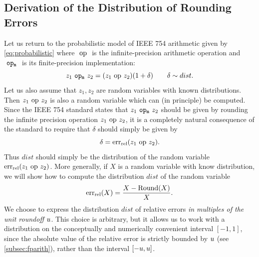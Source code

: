 \subsection{Derivation of the Distribution of Rounding Errors}\label{subsec:LPerror_dist}

Let us return to the probabilistic model of IEEE 754 arithmetic given by \cref{eq:probabilistic} where $~\mathrm{op}~$ is the infinite-precision arithmetic operation and $~\mathtt{op_m}~$ is its finite-precision implementation:
\[
z_1~\mathtt{op_m}~ z_2=(z_1~\mathrm{op}~ z_2)(1+\delta) \qquad\delta\sim dist.
\]
Let us also assume that $z_1,z_2$ are random variables with known distributions.  Then $z_1~\mathrm{op}~ z_2$ is also a random variable which can (in principle) be computed. Since the IEEE 754 standard states that $z_1~\mathtt{op_m}~ z_2$ should be given by rounding the infinite precision operation $z_1~\mathrm{op}~ z_2$, it is a completely natural consequence of the standard to require that $\delta$ should simply be given by 
\[
\delta = \mathrm{err}_{\mathrm{rel}}(z_1~\mathrm{op}~ z_2).
\]
Thus $dist$ should simply be the distribution of the random variable $\mathrm{err}_{\mathrm{rel}}(z_1~\mathrm{op}~ z_2)$. 
More generally, if $X$ is a random variable with know distribution, we will show how to compute the distribution $dist$ of the random variable
\[
\mathrm{err}_{\mathrm{rel}}(X)=\frac{X-\mathrm{Round}(X)}{X}.
\]
We choose to express the distribution $dist$ of relative errors \emph{in multiples of the unit roundoff $u$}. This choice is arbitrary, but it allows us to work with a distribution on the conceptually and numerically convenient interval $\left[-1,1\right]$, since the absolute value of the relative error is strictly bounded by $u$ (see \cref{subsec:fparith}), rather than the interval $\left[-u,u\right]$. 

